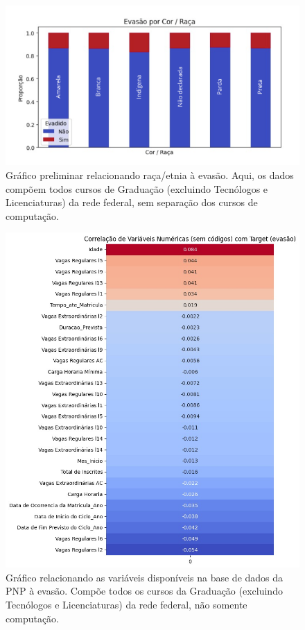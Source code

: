 \documentclass[english, spanish, brazilian]{RBIEarticle} %
\begin{document}
\begin{figure}[h]
    \centerline{\includegraphics[scale=0.8]{images/evasao_por_raca.png}}
    \caption{Gráfico preliminar relacionando raça/etnia à evasão. Aqui, os dados compõem todos cursos de Graduação (excluindo Tecnólogos e Licenciaturas) da rede federal, sem separação dos cursos de computação.}
    \label{fig:one}
\end{figure}

\begin{figure}[h]
    \centerline{\includegraphics[scale=0.60]{images/correlacao_variaveis_num_com_target.jpeg}}
    \caption{Gráfico relacionando as variáveis disponíveis na base de dados da PNP à evasão. Compõe todos os cursos da Graduação (excluindo Tecnólogos e Licenciaturas) da rede federal, não somente computação.}
    \label{fig:one}
\end{figure}
\end{document}
